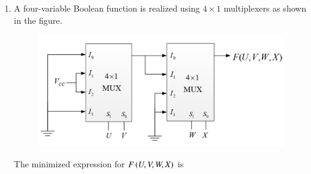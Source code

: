 \documentclass[a4paper, 11pt]{article}
\begin{document}
\begin{enumerate}
    \hfill{}

    \item A four-variable Boolean function is realized using $4 \times 1$ multiplexers as shown in the figure.
    \begin{figure}[H]
        \centering
        \includegraphics[width=0.8\columnwidth]{figs/q31.png}
        \caption*{}
        \label{fig:q31}
    \end{figure}
    The minimized expression for $F\left(U,V,W,X\right)$ is
    \begin{enumerate}
    \end{enumerate}
    
    \hfill{}


\end{enumerate}
\end{document}
